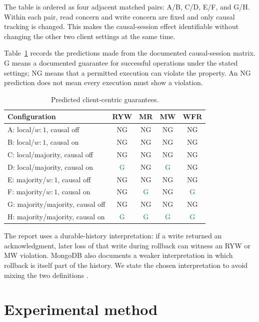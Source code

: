 \documentclass[11pt,a4paper]{article}
\newcommand{\ok}{\textcolor{teal}{G}}
\newcommand{\noguarantee}{\textcolor{red!70!black}{NG}}
\begin{document}
The table is ordered as four adjacent matched pairs: A/B, C/D, E/F, and G/H. Within
each pair, read concern and write concern are fixed and only causal tracking is
changed. This makes the causal-session effect identifiable without changing the
other two client settings at the same time.

Table~\ref{tab:predictions} records the predictions made from the documented causal-session
matrix. G means a documented guarantee for successful operations under the stated settings;
NG means that a permitted execution can violate the property. An NG prediction does not
mean every execution must show a violation.

\begin{table}[ht]
\centering
\caption{Predicted client-centric guarantees.}
\label{tab:predictions}
\begin{tabular}{@{}lcccc@{}}
\toprule
Configuration & RYW & MR & MW & WFR\\
\midrule
A: local/$w:1$, causal off & \noguarantee & \noguarantee & \noguarantee & \noguarantee\\
B: local/$w:1$, causal on & \noguarantee & \noguarantee & \noguarantee & \noguarantee\\
C: local/majority, causal off & \noguarantee & \noguarantee & \noguarantee & \noguarantee\\
D: local/majority, causal on & \ok & \noguarantee & \ok & \noguarantee\\
E: majority/$w:1$, causal off & \noguarantee & \noguarantee & \noguarantee & \noguarantee\\
F: majority/$w:1$, causal on & \noguarantee & \ok & \noguarantee & \ok\\
G: majority/majority, causal off & \noguarantee & \noguarantee & \noguarantee & \noguarantee\\
H: majority/majority, causal on & \ok & \ok & \ok & \ok\\
\bottomrule
\end{tabular}
\end{table}

The report uses a durable-history interpretation: if a write returned an acknowledgment,
later loss of that write during rollback can witness an RYW or MW violation. MongoDB also
documents a weaker interpretation in which rollback is itself part of the history. We state
the chosen interpretation to avoid mixing the two definitions \cite{mongo-causal,mongo-rollback}.

\section{Experimental method}
\end{document}
